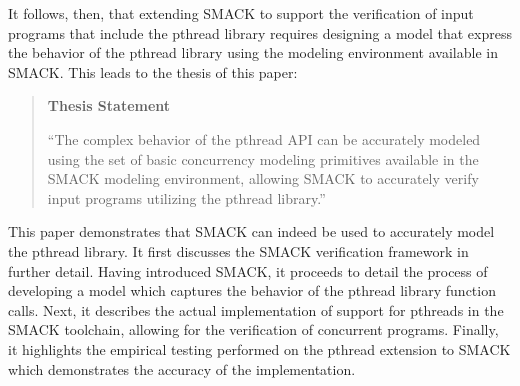 It follows, then, that extending SMACK to support the verification of
input programs that include the pthread library requires designing a
model that express the behavior of the pthread library using the
modeling environment available in SMACK.  This leads to the thesis of
this paper:

\begin{quote}
\begin{center}
\textbf{Thesis Statement}
\end{center}
``The complex behavior of the pthread
API can be accurately modeled using the set of basic concurrency
modeling primitives available in the SMACK modeling environment,
allowing SMACK to accurately verify input programs utilizing the
pthread library.''
\end{quote}

This paper demonstrates that SMACK can indeed be used to
accurately model the pthread library.  It first discusses the SMACK
verification framework in further detail.  Having introduced SMACK, it 
proceeds to detail the process of developing a model which captures
the behavior of the pthread library function calls. Next, it describes
the actual implementation of support for pthreads in the SMACK
toolchain, allowing for the verification of concurrent programs.
Finally, it highlights the empirical testing performed on the pthread
extension to SMACK which demonstrates the accuracy of the
implementation.  

